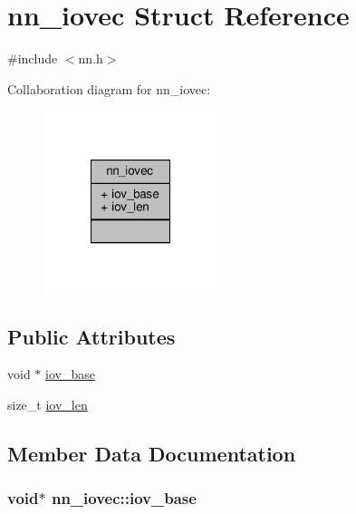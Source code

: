 \hypertarget{structnn__iovec}{}\section{nn\+\_\+iovec Struct Reference}
\label{structnn__iovec}


{\ttfamily \#include $<$nn.\+h$>$}



Collaboration diagram for nn\+\_\+iovec\+:\nopagebreak
\begin{figure}[H]
\begin{center}
\leavevmode
\includegraphics[width=144pt]{structnn__iovec__coll__graph}
\end{center}
\end{figure}
\subsection*{Public Attributes}
\begin{DoxyCompactItemize}
\item 
void $\ast$ \hyperlink{structnn__iovec_aab8a89340c00a8222e8659c825afbe7f}{iov\+\_\+base}
\item 
size\+\_\+t \hyperlink{structnn__iovec_ae13415a807909521c74f6776515364b1}{iov\+\_\+len}
\end{DoxyCompactItemize}


\subsection{Member Data Documentation}
\subsubsection[{iov\+\_\+base}]{\setlength{\rightskip}{0pt plus 5cm}void$\ast$ nn\+\_\+iovec\+::iov\+\_\+base}\hypertarget{structnn__iovec_aab8a89340c00a8222e8659c825afbe7f}{}\label{structnn__iovec_aab8a89340c00a8222e8659c825afbe7f}

